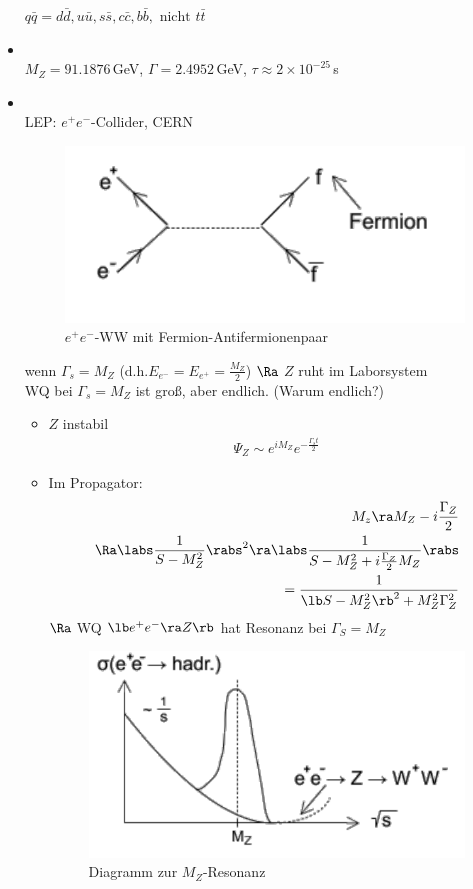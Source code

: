 \begin{itemize}
$q\bar{q} = d\bar{d},u\bar{u},s\bar{s},c\bar{c},b\bar{b},\text{ nicht } t\bar{t}$
\item {}\\
$M_Z = 91.1876$\,GeV, $\Gamma = 2.4952$\,GeV, $\tau \approx 2\times 10^{-25}$\,s
\item {}\\
LEP: $e^+e^-$-Collider, CERN

\begin{figure}[!ht]
\centering
\includegraphics[width=.5\textwidth]{imgs/ep5-fig-8-18.pdf}
\caption{$e^+e^-$-WW mit Fermion-Antifermionenpaar \label{fig:8.18}}
\end{figure}

wenn $\Gamma_s = M_Z$ (d.h.$E_{e^-} = E_{e^+} = \frac{M_Z}{2}$) $\Ra$ $Z$ ruht im Laborsystem\\
WQ bei $\Gamma_s = M_Z$ ist groß, aber endlich. (Warum endlich?)
\begin{itemize}
\item $Z$ instabil
\begin{align}
\Psi_Z \sim e^{iM_Z} e^{-\frac{\Gamma_s t}{2}}
\end{align}
\item Im Propagator:
\begin{align}
 M_z \ra M_Z - i \frac{\Gamma_Z}{2}\\
 \Ra \labs \frac{1}{S-M_Z^2}\rabs^2 \ra \labs \frac{1}{S- M_Z^2 + i \frac{\Gamma_Z}{2} M_Z}\rabs\\
 = \frac{1}{\lb S- M_Z^2\rb ^2 + M_Z^2 \Gamma_Z^2}
\end{align}
$\Ra$ WQ $\lb e^+e^-\ra Z\rb $ hat Resonanz bei $\Gamma_S = M_Z$

\begin{figure}[!ht]
\centering
\includegraphics[width=.5\textwidth]{imgs/ep5-fig-8-19.pdf}
\caption{Diagramm zur $M_Z$-Resonanz \label{fig:8.19}}
\end{figure}



\end{itemize}
\end{itemize}
